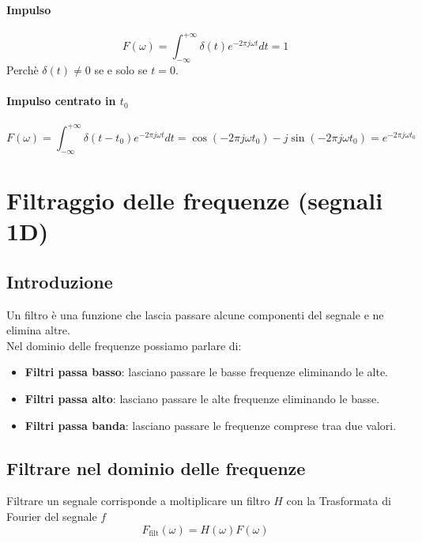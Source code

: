 \documentclass[12pt, a4paper]{report}
\begin{document}
\subsubsection{Impulso}
\begin{equation*}
    F(\omega) = \int_{-\infty}^{+\infty} \delta(t)e^{-2\pi j\omega t}dt = 1
\end{equation*}
Perchè $\delta(t)\neq 0 $ se e solo se $t=0$.
\subsubsection{Impulso centrato in $t_{0}$}
\begin{equation*}
    F(\omega) = \int_{-\infty}^{+\infty} \delta(t-t_{0})e^{-2\pi j\omega t}dt = \cos(-2\pi j\omega t_{0})-j\sin(-2\pi j\omega t_{0}) = e^{-2\pi j\omega t_{0}}
\end{equation*}
\chapter{Filtraggio delle frequenze (segnali 1D)}
\section{Introduzione}
Un filtro è una funzione che lascia passare alcune componenti del segnale e ne elimina altre.\\
Nel dominio delle frequenze possiamo parlare di:
\begin{itemize}
    \item \textbf{Filtri passa basso}: lasciano passare le basse frequenze eliminando le alte.
    \item \textbf{Filtri passa alto}: lasciano passare le alte frequenze eliminando le basse.
    \item \textbf{Filtri passa banda}: lasciano passare le frequenze comprese traa due valori.
\end{itemize}
\section{Filtrare nel dominio delle frequenze}
Filtrare  un segnale corrisponde a moltiplicare un filtro $H$ con la Trasformata di Fourier del segnale $f$
\begin{equation*}
    F_{\text{filt}}(\omega) = H(\omega)F(\omega)
\end{equation*}
\end{document}
